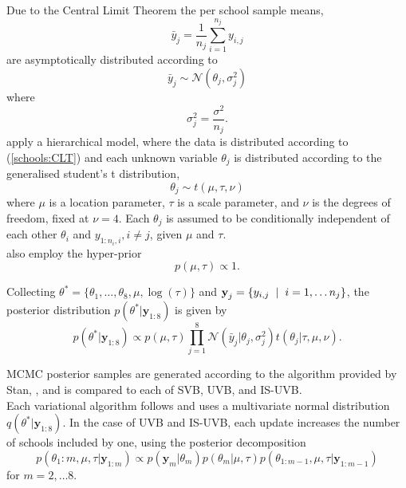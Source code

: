 \documentclass[
12pt, %
onehalfspacing, %
nohyperref, %
headsepline, %
chapterinoneline, %
]{MastersDoctoralThesis} %
\begin{document}
Due to the Central Limit Theorem \citep{Casella2002} the per school sample means,
\begin{equation}
\label{schools:mean}
\bar{y}_j = \frac{1}{n_j} \sum_{i=1}^{n_j} y_{i, j}
\end{equation}
are asymptotically distributed according to
\begin{equation}
\label{schools:CLT}
\bar{y}_{j} \sim \mathcal{N}(\theta_j, \sigma^2_j)
\end{equation}
where
\begin{equation}
\label{schools:var}
\sigma_j^2 = \frac{\sigma^2}{n_j}.
\end{equation}
\citet{Gelman2014} apply a hierarchical model, where the data is distributed according to (\ref{schools:CLT}) and each unknown variable $\theta_j$ is distributed according to the generalised student's t distribution,
\begin{equation}
\label{schools:hier}
\theta_j \sim t(\mu, \tau, \nu)
\end{equation}
where $\mu$ is a location parameter, $\tau$ is a scale parameter, and $\nu$ is the degrees of freedom, fixed at $\nu = 4$. Each $\theta_j$ is assumed to be conditionally independent of each other $\theta_i$ and $y_{1:n_i, i}, i \neq j$, given $\mu$ and $\tau$. 
\\

\citet{Gelman2014} also employ the hyper-prior
\begin{equation}
\label{schools:hyperprior}
p(\mu, \tau) \propto 1.
\end{equation}

Collecting $\theta^* = \{\theta_1,  \ldots, \theta_8, \mu, \log(\tau)\}$ and $\textbf{y}_{j} = \{y_{i, j} \hspace{2mm}| \hspace{2mm} i = 1,\ldots n_j\}$, the posterior distribution $p(\theta^* | \textbf{y}_{1:8})$ is given by
\begin{equation}
\label{schools:posterior}
p(\theta^* | \textbf{y}_{1:8}) \propto  p(\mu, \tau) \prod_{j=1}^8 \mathcal{N}(\bar{y}_j | \theta_j, \sigma^2_j) t(\theta_j | \tau, \mu, \nu).
\end{equation}

MCMC posterior samples are generated according to the algorithm provided by Stan, \citep{RStanGettingStarted}, and is compared to each of SVB, UVB, and IS-UVB.
\\

Each variational algorithm follows \citet{Kucukelbir2017} and uses a multivariate normal distribution $q(\theta^* | \textbf{y}_{1:8})$. In the case of UVB and IS-UVB, each update increases the number of schools included by one, using the posterior decomposition
\begin{equation}
\label{schools:update}
p(\theta_1:m, \mu, \tau | \textbf{y}_{1:m}) \propto p(\textbf{y}_m | \theta_m)p(\theta_m | \mu, \tau)p(\theta_{1:m-1}, \mu, \tau | \textbf{y}_{1:m-1})
\end{equation}
for $m = 2, \ldots 8$.
\\
\end{document}
